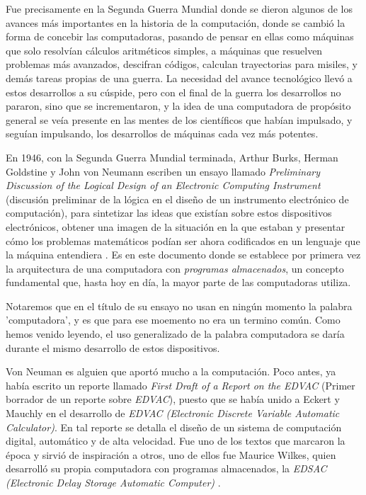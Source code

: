 \documentclass[letterpaper,12pt,oneside]{book}
\begin{document}
		Fue precisamente en la Segunda Guerra Mundial donde se dieron algunos de los avances más importantes en la historia de la computación, donde se cambió la forma de
		concebir las computadoras, pasando de pensar en ellas como máquinas que solo resolvían cálculos aritméticos simples, a máquinas que resuelven problemas más avanzados, descifran
		códigos, calculan trayectorias para
		misiles, y demás tareas propias de una guerra. La necesidad del avance tecnológico llevó a estos desarrollos a su cúspide, pero con el final de
		la guerra los desarrollos no pararon, sino que se incrementaron, y la idea de una computadora de propósito general se veía
		presente en las mentes de los científicos que habían impulsado, y seguían impulsando, los desarrollos de máquinas cada vez más potentes.
		

		En 1946, con la Segunda Guerra Mundial terminada, Arthur Burks, Herman Goldstine y John von Neumann 
		escriben
		un  ensayo llamado \textit{Preliminary Discussion of the Logical Design of an Electronic Computing Instrument} (discusión preliminar de la lógica en el diseño de un instrumento electrónico de computación), para sintetizar las ideas que existían sobre estos dispositivos electrónicos, obtener una imagen de la situación en la que estaban y
		presentar cómo los problemas matemáticos podían ser ahora codificados en un lenguaje que la máquina entendiera \cite{randell_preliminary_1982}. Es en este documento donde
		se establece por primera vez la arquitectura de una computadora con  \textit{programas almacenados}, un concepto fundamental que, hasta hoy
		en día, la mayor parte de las computadoras utiliza.
  
        Notaremos que en el título de su ensayo no usan en ningún momento la palabra 'computadora', y
		es que para ese moemento no era un termino común. Como hemos venido leyendo, el uso generalizado de la palabra computadora
		se daría durante el mismo desarrollo de estos dispositivos.
  
        Von Neuman es alguien que aportó mucho a la computación. Poco antes, ya había escrito un reporte llamado \textit{First Draft of a Report on the EDVAC} (Primer borrador de un reporte sobre \textit{EDVAC}),
		puesto que se había unido a Eckert y Mauchly en el desarrollo de
		\textit{EDVAC (Electronic Discrete Variable Automatic Calculator)}. En tal reporte se detalla el diseño de un sistema de computación digital, automático
		y de alta velocidad. Fue uno de los textos que marcaron la época y sirvió de inspiración a otros, uno de ellos fue Maurice Wilkes, quien desarrolló su propia
		computadora con programas almacenados, la \textit{EDSAC (Electronic Delay Storage Automatic Computer)} \cite{oregan_brief_2012}. 
  
\end{document}
